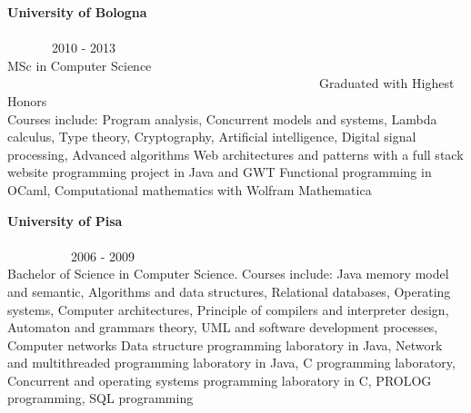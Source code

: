\begin{resume}
        \textbf{University of Bologna} \ \ \ \ \ \ \ \ \ \ \ \ \ \ \ \ \ \ \ \ \ \ \ \ \ \ \ \ \ \ \ \ \ \ \ \ \ \ \ \ \ \ \ \ \ \ \ \ \ \ \ \ \ \ \ \ \ \ \ \ \ \ \ \ \ \ \ \ \ \ \ \ \ \ \ \ \ \ \ 2010 - 2013 \\
        MSc in Computer Science  \ \ \ \ \ \ \ \ \ \ \ \ \ \ \ \ \ \ \ \ \ \ \ \ \ \ \ \ \ \ \ \ \ \ \ \ \ \ \ \ \ \ \ \ \ \ \ \ \ Graduated with Highest Honors\\
        Courses include:
        Program analysis,
        Concurrent models and systems,
        Lambda calculus,
        Type theory,
        Cryptography,
        Artificial intelligence,
        Digital signal processing,
        Advanced algorithms
        Web architectures and patterns with a full stack website programming project in Java and GWT
        Functional programming in OCaml, 
        Computational mathematics with Wolfram Mathematica

        \textbf{University of Pisa} \ \ \ \ \ \ \ \ \ \ \ \ \ \ \ \ \ \ \ \ \ \ \ \ \ \ \ \ \ \ \ \ \ \ \ \ \ \ \ \ \ \ \ \ \ \ \ \ \ \ \ \ \ \ \ \ \ \ \ \ \ \ \ \ \ \ \ \ \ \ \ \ \ \ \ \ \ \ \ \ \ \ 2006 - 2009 \\
        Bachelor of Science in Computer Science. Courses include:
        Java memory model and semantic,
        Algorithms and data structures,
        Relational databases,
        Operating systems,
        Computer architectures,
        Principle of compilers and interpreter design,
        Automaton and grammars theory,
        UML and software development processes,
        Computer networks
        Data structure programming laboratory in Java,
        Network and multithreaded programming laboratory in Java,
        C programming laboratory,
        Concurrent and operating systems programming laboratory in C,
        PROLOG programming,
        SQL programming




\end{resume}
